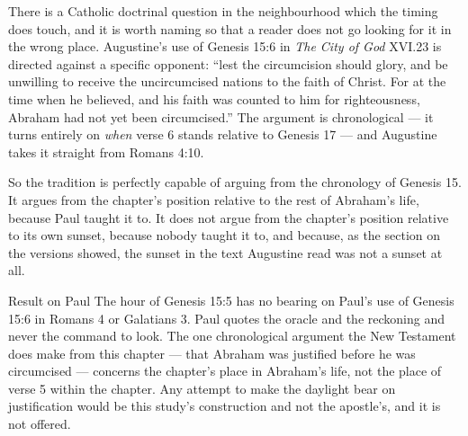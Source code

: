 There is a Catholic doctrinal question in the neighbourhood which the timing does
touch, and it is worth naming so that a reader does not go looking for it in the
wrong place. Augustine's use of Genesis 15:6 in \textit{The City of God} XVI.23
is directed against a specific opponent: ``lest the circumcision should glory, and
be unwilling to receive the uncircumcised nations to the faith of Christ. For at
the time when he believed, and his faith was counted to him for righteousness,
Abraham had not yet been circumcised.'' The argument is chronological --- it
turns entirely on \emph{when} verse 6 stands relative to Genesis 17 --- and
Augustine takes it straight from Romans 4:10.

So the tradition is perfectly capable of arguing from the chronology of Genesis
15. It argues from the chapter's position relative to the rest of Abraham's life,
because Paul taught it to. It does not argue from the chapter's position relative
to its own sunset, because nobody taught it to, and because, as the section on
the versions showed, the sunset in the text Augustine read was not a sunset at
all.

\begin{studybox}{Result on Paul}
The hour of Genesis 15:5 has no bearing on Paul's use of Genesis 15:6 in Romans
4 or Galatians 3. Paul quotes the oracle and the reckoning and never the command
to look. The one chronological argument the New Testament does make from this
chapter --- that Abraham was justified before he was circumcised --- concerns the
chapter's place in Abraham's life, not the place of verse 5 within the chapter.
Any attempt to make the daylight bear on justification would be this study's
construction and not the apostle's, and it is not offered.
\end{studybox}
